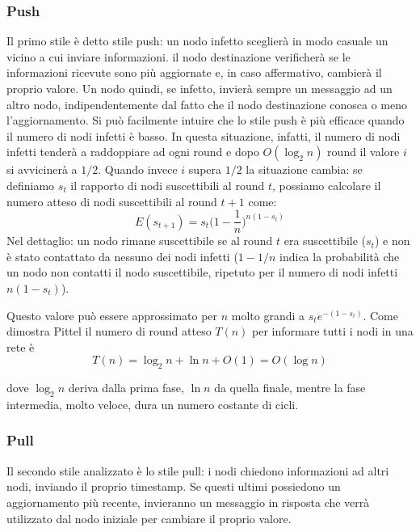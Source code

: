 \subsubsection{Push}
Il primo stile è detto stile push: un nodo infetto sceglierà in modo casuale un vicino a cui inviare informazioni. il nodo destinazione verificherà se le informazioni ricevute sono più aggiornate e, in caso affermativo, cambierà il proprio valore. Un nodo quindi, se infetto, invierà sempre un messaggio ad un altro nodo, indipendentemente dal fatto che il nodo destinazione conosca o meno l'aggiornamento. Si può facilmente intuire che lo stile push è più efficace quando il numero di nodi infetti è basso. In questa situazione, infatti, il numero di nodi infetti tenderà a raddoppiare ad ogni round e dopo $O(\log_2 n)$ round il valore $i$ si avvicinerà a $1/2$. Quando invece $i$ supera $1/2$ la situazione cambia: se definiamo $s_t$ il rapporto di nodi suscettibili al round $t$, possiamo calcolare il numero atteso di nodi suscettibili al round $t + 1$ come:
\begin{equation}
    E(s_{t + 1}) = s_t  \Big(1 - \frac{1}{n}\Big)^{n(1-s_t)}
\end{equation}
Nel dettaglio: un nodo rimane suscettibile se al round $t$ era suscettibile ($s_t$) e non è stato contattato da nessuno dei nodi infetti ($1-1/n$ indica la probabilità che un nodo non contatti il nodo suscettibile, ripetuto per il numero di nodi infetti $n(1-s_t)$).

Questo valore può essere approssimato per $n$ molto grandi a $s_t e^{-(1-s_t)}$. Come dimostra Pittel \cite{pittel} il numero di round atteso $T(n)$ per informare tutti i nodi in una rete è
\begin{equation}
    T(n)= \log_2 n + \ln n + O(1) = O(\log n)
\end{equation}

dove $\log_2 n$ deriva dalla prima fase, $\ln n$ da quella finale, mentre la fase intermedia, molto veloce, dura un numero costante di cicli.
\subsubsection{Pull}
Il secondo stile analizzato è lo stile pull: i nodi chiedono informazioni ad altri nodi, inviando il proprio timestamp. Se questi ultimi possiedono un aggiornamento più recente, invieranno un messaggio in risposta che verrà utilizzato dal nodo iniziale per cambiare il proprio valore.

